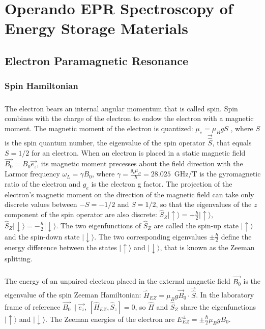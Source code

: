 \chapter{Operando EPR Spectroscopy of Energy Storage Materials}
\section{Electron Paramagnetic Resonance}
\subsection{Spin Hamiltonian}
\paragraph*{}
The electron bears an internal angular momentum that is called spin. Spin combines with the charge of the electron to endow the electron with a magnetic moment. The magnetic moment of the electron is quantized: $\mu_e=\mu_BgS$ \cite{SternGerlach1922}, where $S$ is the spin quantum number, the eigenvalue of the spin operator $\vec{\hat{S}}$, that equals $S=1/2$ for an electron. When an electron is placed in a static magnetic field $\vec{B_0}=B_0 \vec{e_z}$, its magnetic moment precesses about the field direction with the Larmor frequency $\omega_L = \gamma B_0$, where $\gamma=\frac{g_e\mu_B}{\hbar}=28.025$~GHz/T is the gyromagnetic ratio of the electron and $g_e$ is the electron g factor. The projection of the electron's magnetic moment on the direction of the magnetic field can take only discrete values between $-S=-1/2$ and $S=1/2$, so that the eigenvalues of the $z$ component of the spin operator are also discrete: $\hat{S}_Z\vert{\uparrow\rangle}=+\frac{\hbar}{2}\vert{\uparrow\rangle}$, $\hat{S}_Z\vert{\downarrow\rangle}=-\frac{\hbar}{2}\vert{\downarrow\rangle}$. The two eigenfunctions of $\hat{S}_Z$ are called the spin-up state $\vert{\uparrow\rangle}$ and the spin-down state $\vert{\downarrow\rangle}$. The two corresponding eigenvalues $\pm\frac{\hbar}{2}$ define the energy difference between the states $\vert{\uparrow\rangle}$ and $\vert{\downarrow\rangle}$, that is known as the Zeeman splitting.

\paragraph*{}
The energy of an unpaired electron placed in the external magnetic field $\vec{B_0}$ is the eigenvalue of the spin Zeeman Hamiltonian: $\hat{H}_{EZ} = \mu_B g\vec{B}_0\cdot\vec{\hat{S}}$. In the laboratory frame of reference $\vec{B_0}\parallel\vec{e_z}$, $\left[\hat{H}_{EZ},\hat{S}_z\right]=0$, so $\hat{H}$ and $\hat{S}_Z$ share the eigenfunctions $\vert{\uparrow\rangle}$ and $\vert{\downarrow\rangle}$. The Zeeman energies of the electron are $E_{EZ}^{\pm} = \pm \frac{\hbar}{2}\mu_B g B_0$. 


